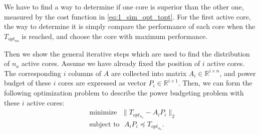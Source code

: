 We have to find a way to determine if one core is superior than the other one, measured by the cost function in \eqref{eq:1_sim_opt_topt}. For the first active core, the way to determine it is simply compare the performance of each core when the $T_{opt_{na}}$ is reached, and choose the core with maximum performance.

Then we show the general iterative steps which are used to find the distribution of $n_{a}$ active cores. Assume we have already fixed the position of $i$ active cores. The corresponding $i$ columns of $A$ are collected into
matrix $A_i \in \mathbb{R}^{i \times n}$, and power budget of these $i$
cores are expressed as vector $P_i \in \mathbb{R}^{i \times 1}$. Then,
we can form the following optimization problem to describe the power
budgeting problem with these $i$ active cores:
\begin{equation}\label{eq:temp_ss_i_pb}
  \begin{split}
    &\text{minimize~~} \|T_{opt_{n_{a}}}-A_i P_i\|_2\\
    &\text{subject to~~} A_i P_i\preceq T_{opt_{n_{a}}}.
  \end{split}
\end{equation}

